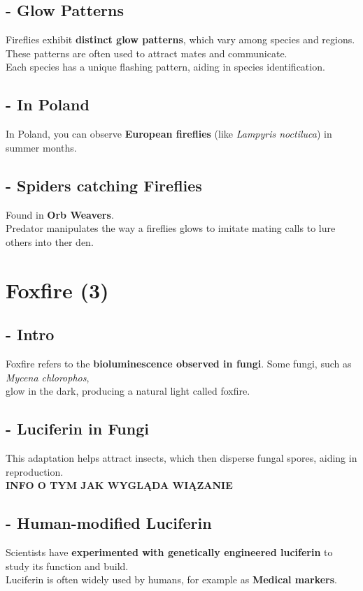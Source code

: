 \documentclass{article}
\begin{document}
\subsection*{- Glow Patterns }
Fireflies exhibit \textbf{distinct glow patterns}, which vary among species and regions.\\ 
These patterns are often used to attract mates and communicate.\\ 
Each species has a unique flashing pattern, aiding in species identification.

\subsection*{- In Poland }
In Poland, you can observe \textbf{European fireflies} (like \textit{Lampyris noctiluca}) in summer months.

\subsection*{- Spiders catching Fireflies }
Found in \textbf{Orb Weavers}.\\
Predator manipulates the way a fireflies glows to imitate mating calls to lure others into ther den.


\section*{Foxfire (3)}

\subsection*{- Intro }
Foxfire refers to the \textbf{bioluminescence observed in fungi}. Some fungi, such as \textit{Mycena chlorophos},\\ 
glow in the dark, producing a natural light called foxfire.

\subsection*{- Luciferin in Fungi }
This adaptation helps attract insects, which then disperse fungal spores, aiding in reproduction.\\
\textbf{INFO O TYM JAK WYGLĄDA WIĄZANIE}


\subsection*{- Human-modified Luciferin }
Scientists have \textbf{experimented with genetically engineered luciferin} to study its function and build.\\
Luciferin is often widely used by humans, for example as \textbf{Medical markers}.
\end{document}
